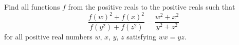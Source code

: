 Find all functions $f$ from the positive reals to the positive reals such that
\[ \frac{f(w)^2 + f(x)^2}{f(y^2)+f(z^2)} = \frac{w^2+x^2}{y^2+z^2} \]
for all positive real numbers $w$, $x$, $y$, $z$ satisfying $wx=yz$.